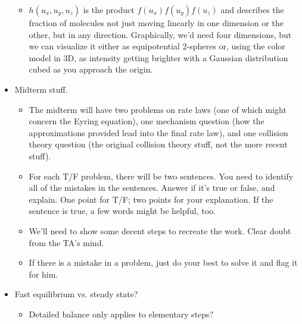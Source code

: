 \documentclass[../notes.tex]{subfiles}
\begin{document}
\begin{itemize}
\begin{itemize}
        \item $h(u_x,u_y,u_z)$ is the product $f(u_x)f(u_y)f(u_z)$ and describes the fraction of molecules not just moving linearly in one dimension or the other, but in any direction. Graphically, we'd need four dimensions, but we can visualize it either as equipotential 2-spheres or, using the color model in 3D, as intensity getting brighter with a Gaussian distribution cubed as you approach the origin.
    \end{itemize}
    \item Midterm stuff.
    \begin{itemize}
        \item The midterm will have two problems on rate laws (one of which might concern the Eyring equation), one mechanism question (how the approximations provided lead into the final rate law), and one collision theory question (the original collision theory stuff, not the more recent stuff).
        \item For each T/F problem, there will be two sentences. You need to identify all of the mistakes in the sentences. Answer if it's true or false, and explain. One point for T/F; two points for your explanation. If the sentence is true, a few words might be helpful, too.
        \item We'll need to show some decent steps to recreate the work. Clear doubt from the TA's mind.
        \item If there is a mistake in a problem, just do your best to solve it and flag it for him.
    \end{itemize}
    \item Fast equilibrium vs. steady state?
    \begin{itemize}
        \item Detailed balance only applies to elementary steps?
    \end{itemize}
\end{itemize}
\end{document}

